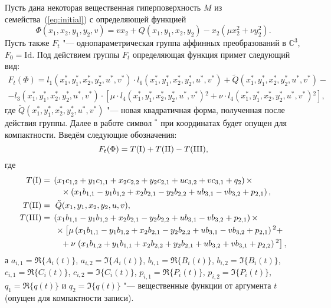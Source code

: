 \documentclass[../main.tex]{subfiles}
\begin{document}
Пусть дана некоторая вещественная гиперповерхность $M$ из семейства~(\ref{eq:initial}) с определяющей функцией $$\Phi(x_1, x_2, y_1, y_2, v) = v x_2 + Q(x_1, y_1, x_2, y_2) - x_2 (\mu x_2^2 + \nu y_2^2).$$ Пусть также $F_t$ "--- однопараметрическая группа аффинных преобразований в $\mathbb{C}^3$, $F_0 = \mathrm{Id}$.
Под действием группы $F_t$ определяющая функция примет следующий вид:
\begin{multline*}
F_t(\Phi) = l_1(x_1^*, y_1^*, x_2^*, y_2^*, u^*, v^*) \cdot l_6(x_1^*, y_1^*, x_2^*, y_2^*, u^*, v^*) + \tilde{Q}(x_1^*, y_1^*, x_2^*, y_2^*, u^*, v^*) - \\
- l_3(x_1^*, y_1^*, x_2^*, y_2^*, u^*, v^*) \cdot \left[\mu \cdot l_4(x_1^*, y_1^*, x_2^*, y_2^*, u^*, v^*){}^2 + \nu \cdot l_4(x_1^*, y_1^*, x_2^*, y_2^*, u^*, v^*){}^2\right],
\end{multline*}
где $\tilde{Q}(x_1^*, y_1^*, x_2^*, y_2^*, u^*, v^*)$ "--- новая квадратичная форма, полученная после действия группы. Далее в работе символ ${}^*$ при координатах будет опущен для компактности.  Введём следующие обозначения:
\begin{equation*}
F_t(\Phi) = T(\mathrm{\RN{1}}) + T(\mathrm{\RN{2}}) - T(\mathrm{\RN{3}}),
\end{equation*}
где
\begin{align*}
T(\mathrm{\RN{1}}) &=
\begin{multlined}[t]
\left(x_1 c_{1,2}+y_1 c_{1,1}+x_2 c_{2,2}+y_2 c_{2,1} + u c_{3,2}+v c_{3,1}+q_2\right) \times \\
\times \left(x_1 b_{1,1}-y_1 b_{1,2}+x_2 b_{2,1}-y_2 b_{2,2} + u b_{3,1}-v b_{3,2}+p_{2,1}\right),
\end{multlined}\\
T(\mathrm{\RN{2}}) &=
\begin{multlined}[t]
\ \tilde{Q}(x_1,y_1,x_2,y_2,u,v),
\end{multlined}\\
T(\mathrm{\RN{3}}) &=
\begin{multlined}[t]
\left(x_1 b_{1,1}-y_1 b_{1,2}+x_2 b_{2,1}-y_2 b_{2,2} + u b_{3,1}-v b_{3,2} + p_{2,1}\right) \times \\
\times \left[\mu  \left(x_1 b_{1,1}-y_1 b_{1,2}+x_2 b_{2,1}-y_2 b_{2,2} + u b_{3,1}-v b_{3,2}+p_{2,1}\right){}^2 + \right. \\
+ \nu \left. \left(x_1 b_{1,2}+y_1 b_{1,1}+x_2 b_{2,2}+y_2 b_{2,1} + u b_{3,2}+v b_{3,1} + p_{2,2}\right){}^2 \right],
\end{multlined}
\end{align*}
а $a_{i, 1} = \Re\{A_i(t)\}$, $a_{i, 2} = \Im\{A_i(t)\}$, $b_{i, 1} = \Re\{B_i(t)\}$, $b_{i, 2} = \Im\{B_i(t)\}$, $c_{i, 1} = \Re\{C_i(t)\}$, $c_{i, 2} = \Im\{C_i(t)\}$, $p_{i, 1} = \Re\{P_i(t)\}$, $p_{i, 2} = \Im\{P_i(t)\}$, $q_1 = \Re\{q(t)\}$ и $q_2 = \Im\{q(t)\}$ "--- вещественные функции от аргумента $t$ (опущен для компактности записи).
\end{document}
